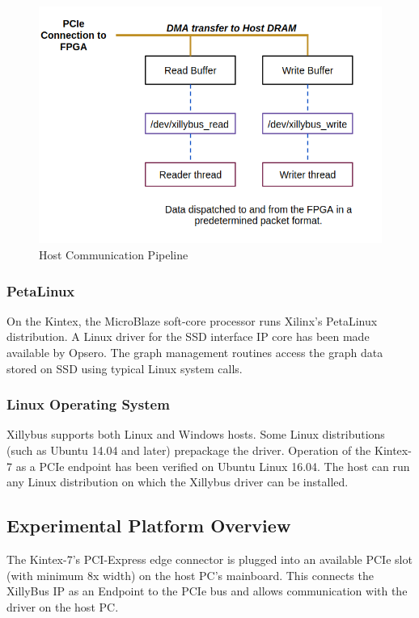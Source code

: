 \begin{figure}[h]
  \includegraphics[scale = 0.4]{pic/HostCommunication.png}
  \caption{Host Communication Pipeline}
  \label{fig:host}
\end{figure}

\subsubsection{PetaLinux}
On the Kintex, the MicroBlaze soft-core processor runs Xilinx's PetaLinux distribution.  A Linux driver for the SSD interface IP core has been made available by Opsero.  The graph management routines access the graph data stored on SSD using typical Linux system calls.

\subsubsection{Linux Operating System}
Xillybus supports both Linux and Windows hosts.  Some Linux distributions (such as Ubuntu 14.04 and later) prepackage the driver.  Operation of the Kintex-7 as a PCIe endpoint has been verified on Ubuntu Linux 16.04.  The host can run any Linux distribution on which the Xillybus driver can be installed.

\subsection{Experimental Platform Overview}
The Kintex-7's PCI-Express edge connector is plugged into an available PCIe slot (with minimum 8x width) on the host PC's mainboard.  This connects the XillyBus IP as an Endpoint to the PCIe bus and allows communication with the driver on the host PC.  

